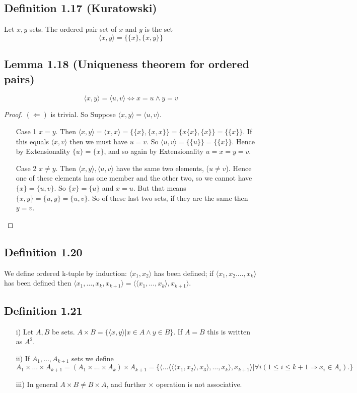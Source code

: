 \documentclass[a4paper, 12pt, twoside]{article}
\begin{document}
\subsection*{Definition 1.17 (Kuratowski)}
Let $x,y$ sets. The ordered pair set of $x$ and $y$ is the set
$$\langle x,y \rangle=\{\{x\},\{x,y\}\}$$
\subsection*{Lemma 1.18 (Uniqueness theorem for ordered pairs)}
$$\langle x,y \rangle = \langle u,v \rangle \iff x=u\wedge y=v$$
\begin{proof}
    $(\Leftarrow)$ is trivial. So Suppose $\langle x,y \rangle = \langle u,v\rangle$.\\
    \begin{itemize}
        \item[Case 1] $x=y$. Then $\langle x,y \rangle = \langle x,x\rangle= \{\{x\},\{x,x\}\}=\{x\{x\},\{x\}\}=\{\{x\}\}$. If this equals $\langle  x,v\rangle$ then we must have $u=v$. So $\langle u,v \rangle=\{\{u\}\}=\{\{x\}\}$. Hence by Extensionality $\{u\}=\{x\}$, and so again by Extensionality $u=x=y=v$.
        \item[Case 2] $x\neq y$. Then $\langle x,y \rangle , \langle u,v\rangle$ have the same two elements, ($u\neq v$). Hence one of these elements has one member and the other two, so we cannot have $\{x\}=\{u,v\}$. So $\{x\}=\{u\}$  and $x=u$. But that means $\{x,y\}=\{u,y\}=\{u,v\}$. So of these last two sets, if they are the same then $y=v$.
    \end{itemize}
\end{proof}
\subsection*{Definition 1.20}
We define ordered k-tuple by induction: $\langle x_{1},x_{2} \rangle$ has been defined; if $\langle x_{1},x_{2}.\dots,x_{k}\rangle$ has been defined then $\langle x_{1},\dots,x_{k},x_{k+1}\rangle=\langle \langle x_{1},\dots,x_{k}\rangle, x_{k+1}\rangle$.
\subsection*{Definition 1.21}
\begin{itemize}
    \item[i)] Let $A,B$ be sets. $A\times B=\{\langle x,y\rangle|x\in A \wedge y \in B\}$. If $A=B$ this is written as $A^{2}$.
    \item[ii)] If $A_{1},\dots,A_{k+1}$ sets we define $A_{1}\times\dots\times A_{k+1}=(A_{1}\times\dots\times A_{k})\times A_{k+1}=
    \{\langle\dots \langle\langle\langle x_{1},x_{2}\rangle,x_{3} \rangle,\dots,x_{k}\rangle,x_{k+1}\rangle|\forall i(1\leq i\leq k+1\Rightarrow x_{i}\in A_{i}). \}$
    \item[iii)] In general $A\times B \neq B\times A$, and further $\times$ operation is not associative.
\end{itemize}
\end{document}

